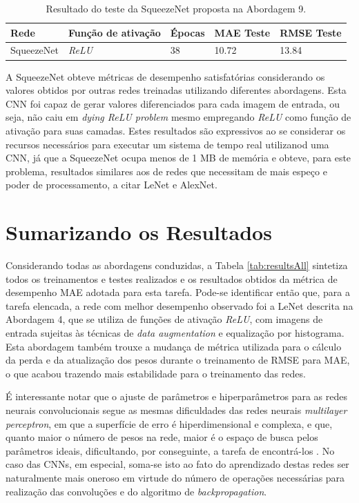 	\begin{table}[!ht]
	\centering
	\caption{Resultado do teste da SqueezeNet proposta na Abordagem 9.}
	\label{tab:results-9}
		\begin{tabular}{l l l l l }
			\toprule
			Rede & Função de ativação & Épocas & MAE Teste & RMSE Teste \\
			\midrule
			SqueezeNet & \emph{ReLU} & 38 & 10.72 & 13.84 \\
			\bottomrule
		\end{tabular}
	\end{table}

	A SqueezeNet obteve métricas de desempenho satisfatórias considerando os valores obtidos por outras redes treinadas utilizando diferentes abordagens. Esta CNN foi capaz de gerar valores diferenciados para cada imagem de entrada, ou seja, não caiu em \emph{dying ReLU problem} mesmo empregando \emph{ReLU} como função de ativação para suas camadas. Estes resultados são expressivos ao se considerar os recursos necessários para executar um sistema de tempo real utilizanod uma CNN, já que a SqueezeNet ocupa menos de 1 MB de memória \cite{squeezenet} e obteve, para este problema, resultados similares aos de redes que necessitam de mais espeço e poder de processamento, a citar LeNet e AlexNet.

\section{Sumarizando os Resultados}

Considerando todas as abordagens conduzidas, a Tabela \ref{tab:resultsAll} sintetiza todos os treinamentos e testes realizados e os resultados obtidos da métrica de desempenho MAE adotada para esta tarefa. Pode-se identificar então que, para a tarefa elencada, a rede com melhor desempenho observado foi a LeNet descrita na Abordagem 4, que se utiliza de funções de ativação \emph{ReLU}, com imagens de entrada sujeitas às técnicas de \emph{data augmentation} e equalização por histograma. Esta abordagem também trouxe a mudança de métrica utilizada para o cálculo da perda e da atualização dos pesos durante o treinamento de RMSE para MAE, o que acabou trazendo mais estabilidade para o treinamento das redes.



É interessante notar que o ajuste de parâmetros e hiperparâmetros para as redes neurais convolucionais segue as mesmas dificuldades das redes neurais \emph{multilayer perceptron}, em que a superfície de erro é hiperdimensional e complexa, e que, quanto maior o número de pesos na rede, maior é o espaço de busca pelos parâmetros ideais, dificultando, por conseguinte, a tarefa de encontrá-los \cite{Teresa:Livro}. No caso das CNNs, em especial, soma-se isto ao fato do aprendizado destas redes ser naturalmente mais oneroso em virtude do número de operações necessárias para realização das convoluções e do algoritmo de \emph{backpropagation}.

